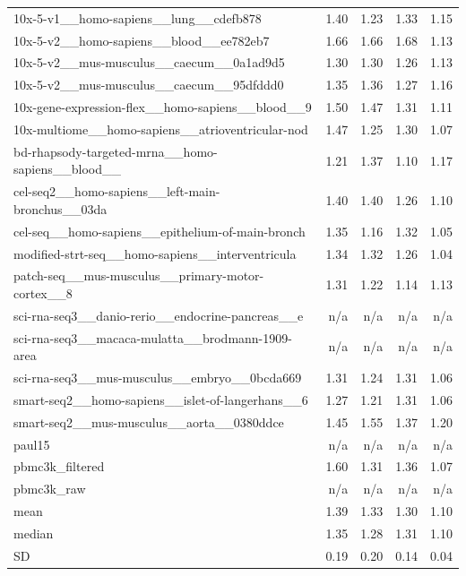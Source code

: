 \begin{table}[H]
{\begin{tabular}{lrrrr}
10x-5-v1\_\_homo-sapiens\_\_lung\_\_cdefb878 & 1.40 & 1.23 & 1.33 & 1.15 \\
10x-5-v2\_\_homo-sapiens\_\_blood\_\_ee782eb7 & 1.66 & 1.66 & 1.68 & 1.13 \\
10x-5-v2\_\_mus-musculus\_\_caecum\_\_0a1ad9d5 & 1.30 & 1.30 & 1.26 & 1.13 \\
10x-5-v2\_\_mus-musculus\_\_caecum\_\_95dfddd0 & 1.35 & 1.36 & 1.27 & 1.16 \\
10x-gene-expression-flex\_\_homo-sapiens\_\_blood\_\_9 & 1.50 & 1.47 & 1.31 & 1.11 \\
10x-multiome\_\_homo-sapiens\_\_atrioventricular-nod & 1.47 & 1.25 & 1.30 & 1.07 \\
bd-rhapsody-targeted-mrna\_\_homo-sapiens\_\_blood\_\_ & 1.21 & 1.37 & 1.10 & 1.17 \\
cel-seq2\_\_homo-sapiens\_\_left-main-bronchus\_\_03da & 1.40 & 1.40 & 1.26 & 1.10 \\
cel-seq\_\_homo-sapiens\_\_epithelium-of-main-bronch & 1.35 & 1.16 & 1.32 & 1.05 \\
modified-strt-seq\_\_homo-sapiens\_\_interventricula & 1.34 & 1.32 & 1.26 & 1.04 \\
patch-seq\_\_mus-musculus\_\_primary-motor-cortex\_\_8 & 1.31 & 1.22 & 1.14 & 1.13 \\
sci-rna-seq3\_\_danio-rerio\_\_endocrine-pancreas\_\_e & n/a & n/a & n/a & n/a \\
sci-rna-seq3\_\_macaca-mulatta\_\_brodmann-1909-area & n/a & n/a & n/a & n/a \\
sci-rna-seq3\_\_mus-musculus\_\_embryo\_\_0bcda669 & 1.31 & 1.24 & 1.31 & 1.06 \\
smart-seq2\_\_homo-sapiens\_\_islet-of-langerhans\_\_6 & 1.27 & 1.21 & 1.31 & 1.06 \\
smart-seq2\_\_mus-musculus\_\_aorta\_\_0380ddce & 1.45 & 1.55 & 1.37 & 1.20 \\
paul15 & n/a & n/a & n/a & n/a \\
pbmc3k\_filtered & 1.60 & 1.31 & 1.36 & 1.07 \\
pbmc3k\_raw & n/a & n/a & n/a & n/a \\
\midrule
mean & 1.39 & 1.33 & 1.30 & 1.10 \\
median & 1.35 & 1.28 & 1.31 & 1.10 \\
SD & 0.19 & 0.20 & 0.14 & 0.04 \\
\bottomrule\end{tabular}}\end{table}
